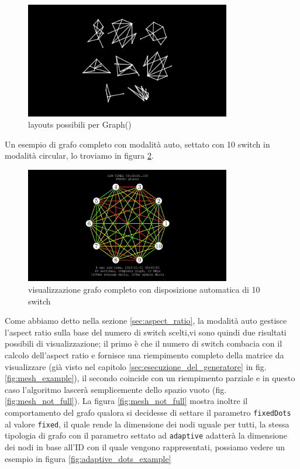 \documentclass[binding=0.6cm]{sapthesis}
\begin{document}
\begin{figure}[h]
    \centering
    \includegraphics[width=0.8\textwidth]{immagini/graph_layouts_types.png}
    \caption{layouts possibili per Graph()}
    \label{fig:graph_layouts_types}
\end{figure}


Un esempio di grafo completo con modalità auto, settato con 10 switch in modalità circular, lo troviamo in figura \ref{fig:custom_complete_autopositioning10}.

\begin{figure}[h]
    \centering
    \includegraphics[width=0.8\textwidth]{immagini/auto_complete_10.JPG}
    \caption{visualizzazione grafo completo con disposizione automatica di 10 switch}
    \label{fig:custom_complete_autopositioning10}
\end{figure}

Come abbiamo detto nella sezione \ref{sec:aspect_ratio}, la modalità auto gestisce l'aspect ratio sulla base del numero di switch scelti,vi sono quindi
due risultati possibili di visualizzazione; il primo è che il numero di switch combacia con il calcolo dell'aspect ratio e fornisce una riempimento
completo della matrice da visualizzare (già visto nel capitolo \ref{sec:esecuzione_del_generatore} in fig. \ref{fig:mesh_example}), 
il secondo coincide con un riempimento parziale e in questo caso l'algoritmo lascerà semplicemente dello spazio vuoto (fig. \ref{fig:mesh_not_full}).
La figura \ref{fig:mesh_not_full} mostra inoltre il comportamento del grafo qualora si decidesse di settare il parametro \lstinline|fixedDots| al valore \lstinline|fixed|, 
il quale rende la dimensione dei nodi uguale per tutti, la stessa tipologia di grafo con il parametro settato ad \lstinline|adaptive| adatterà la dimensione dei nodi
in base all'ID con il quale vengono rappresentati, possiamo vedere un esempio in figura \ref{fig:adaptive_dots_example}
\end{document}
